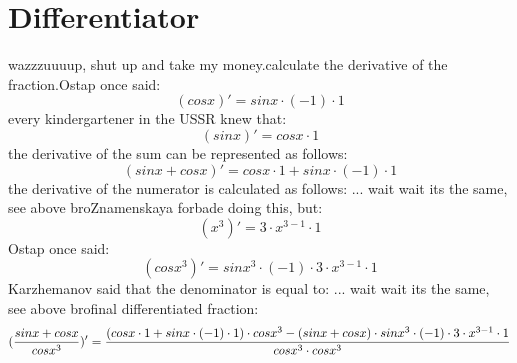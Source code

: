 \documentclass{article}
\begin{document}
\section{Differentiator}
wazzzuuuup, shut up and take my money.\newline calculate the derivative of the fraction.\newline Ostap once said: $$ ({cos  {  x  } })' = { {  { sin  {  x  }  }  \cdot  {  (  -1  )  }  }  \cdot  {  1  } } $$
every kindergartener in the USSR knew that: $$ ({sin  {  x  } })' = { { cos  {  x  }  }  \cdot  {  1  } } $$
the derivative of the sum can be represented as follows: $$ ({ { sin  {  x  }  }  +  { cos  {  x  }  } })' = { {  { cos  {  x  }  }  \cdot  {  1  }  }  +  {  {  { sin  {  x  }  }  \cdot  {  (  -1  )  }  }  \cdot  {  1  }  } } $$
the derivative of the numerator is calculated as follows: ... wait wait its the same, see above bro\newline \newline Znamenskaya forbade doing this, but: $$ ({ {  x  }  ^  {  3  } })' = { {  {  3  }  \cdot  {  {  x  }  ^  {  {  3  }  -  {  1  }  }  }  }  \cdot  {  1  } } $$
Ostap once said: $$ ({cos  {  {  x  }  ^  {  3  }  } })' = { {  { sin  {  {  x  }  ^  {  3  }  }  }  \cdot  {  (  -1  )  }  }  \cdot  {  {  {  3  }  \cdot  {  {  x  }  ^  {  {  3  }  -  {  1  }  }  }  }  \cdot  {  1  }  } } $$
Karzhemanov said that the denominator is equal to: ... wait wait its the same, see above bro\newline \newline final differentiated fraction: $$ ({ {  { sin  {  x  }  }  +  { cos  {  x  }  }  }  \over  { cos  {  {  x  }  ^  {  3  }  }  } })' = { {  {  {  (  {  { cos  {  x  }  }  \cdot  {  1  }  }  +  {  {  { sin  {  x  }  }  \cdot  {  (  -1  )  }  }  \cdot  {  1  }  }  )  }  \cdot  { cos  {  {  x  }  ^  {  3  }  }  }  }  -  {  {  (  { sin  {  x  }  }  +  { cos  {  x  }  }  )  }  \cdot  {  {  { sin  {  {  x  }  ^  {  3  }  }  }  \cdot  {  (  -1  )  }  }  \cdot  {  {  {  3  }  \cdot  {  {  x  }  ^  {  {  3  }  -  {  1  }  }  }  }  \cdot  {  1  }  }  }  }  }  \over  {  { cos  {  {  x  }  ^  {  3  }  }  }  \cdot  { cos  {  {  x  }  ^  {  3  }  }  }  } } $$
\end{document}
